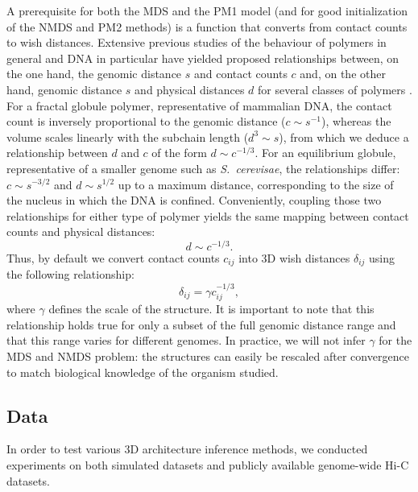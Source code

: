 A prerequisite for both the MDS and the PM1 model (and for good initialization
of the NMDS and PM2 methods) is a function that converts from contact counts
to wish distances.  Extensive previous studies of the behaviour of polymers in
general and DNA in particular have yielded proposed relationships between, on
the one hand, the genomic distance $s$ and contact counts $c$ and, on the
other hand, genomic distance $s$ and physical distances $d$ for several
classes of polymers \citep{grosberg:role, lieberman-aiden:comprehensive,
fudenberg:higher-order}. For a fractal globule polymer, representative of
mammalian DNA, the contact count is inversely proportional to the genomic
distance ($c \sim s ^{-1}$), whereas the volume scales linearly with the
subchain length ($d^3 \sim s$), from which we deduce a relationship between
$d$ and $c$ of the form $d \sim c ^{-1/3}$. For an equilibrium globule,
representative of a smaller genome such as {\em S.\ cerevisae}, the
relationships differ: $c \sim s ^{-3/2}$ and $d \sim s ^ {1 / 2}$ up to a
maximum distance, corresponding to the size of the nucleus in which the DNA is
confined. Conveniently, coupling those two relationships for either type of
polymer yields the same mapping between contact counts and physical distances:
\begin{equation}
d \sim c ^{-1/3}.
\end{equation}
Thus, by default we convert contact counts $c_{ij}$ into 3D wish distances
$\delta_{ij}$ using the following relationship:
\begin{equation}
\delta_{ij} = \gamma c_{ij} ^{-1/3},
\end{equation}
where $\gamma$ defines the scale of the structure. It is important to note that 
this relationship holds true for only a subset of the full genomic distance range and
that this range varies for different genomes. In practice, we will not
infer $\gamma$ for the MDS and NMDS problem: the structures can easily be
rescaled after convergence to match biological knowledge of the organism
studied.

\subsection{Data}
\label{sec:data}

In order to test various 3D architecture inference methods, we
conducted experiments on both simulated datasets and publicly
available genome-wide Hi-C datasets.

